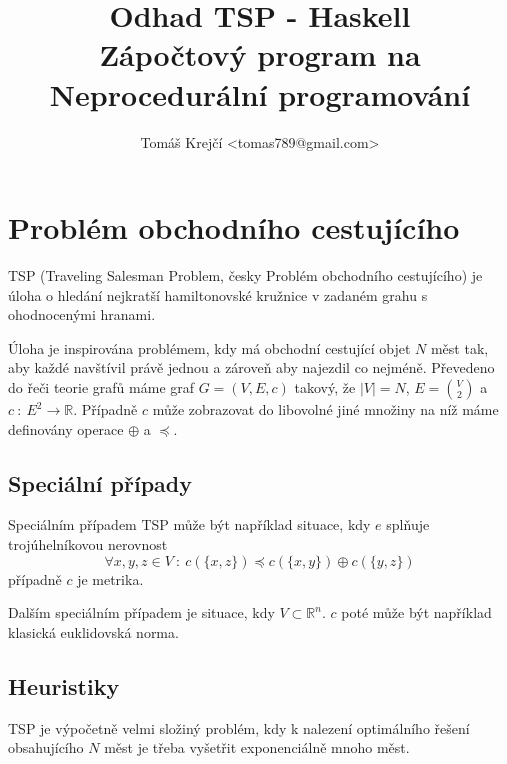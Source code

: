 \documentclass[11pt,twocolumn,a4paper]{article}
\begin{document}
\begin{multicols}{2}
\title{Odhad TSP - Haskell \\ Zápočtový program na Neprocedurální programování}
\author{Tomáš Krejčí <tomas789@gmail.com>}
\maketitle
\end{multicols}

\maketitle

\section{Problém obchodního cestujícího}

TSP (Traveling Salesman Problem, česky Problém obchodního cestujícího) je úloha o hledání nejkratší hamiltonovské kružnice v zadaném grahu s ohodnocenými hranami.

Úloha je inspirována problémem, kdy má obchodní cestující objet $N$ měst tak, aby každé navštívil právě jednou a zároveň aby najezdil co nejméně. Převedeno do řeči teorie grafů máme graf $G = (V, E, c)$ takový, že $|V| = N$, $E = {V \choose 2}$ a $c\ :\ E^2 \to \mathbb{R}$. Případně $c$ může zobrazovat do libovolné jiné množiny na níž máme definovány operace $\oplus$ a $\preceq$.

\subsection{Speciální případy}

Speciálním případem TSP může být například situace, kdy $e$ splňuje trojúhelníkovou nerovnost
$$\forall x,y,z \in V \ : \ c(\{x,z\}) \preceq c(\{x,y\}) \oplus c(\{y,z\})$$
případně $c$ je metrika.

Dalším speciálním případem je situace, kdy $V \subset \mathbb{R}^n$. $c$ poté může být například klasická euklidovská norma.

\subsection{Heuristiky}

TSP je výpočetně velmi složiný problém, kdy k nalezení optimálního řešení obsahujícího $N$ měst je třeba vyšetřit exponenciálně mnoho měst. 
\end{document}
